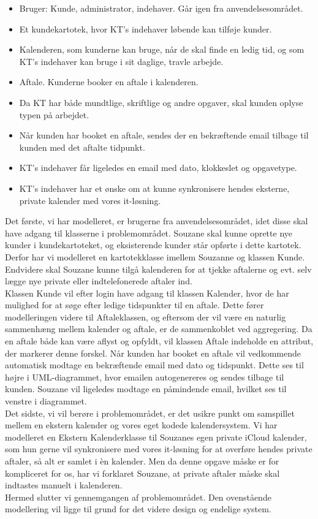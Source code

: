\documentclass[12pt]{article}   %
\begin{document}
\begin{itemize}
\item Bruger: Kunde, administrator, indehaver. Går igen fra
	anvendelsesområdet.
\item Et kundekartotek, hvor KT's indehaver løbende kan tilføje kunder.
\item Kalenderen, som kunderne kan bruge, når de skal finde en ledig tid, og som KT's indehaver kan bruge i sit daglige, travle arbejde.
\item Aftale. Kunderne booker en aftale i kalenderen.
\item Da KT har både mundtlige, skriftlige og andre opgaver, skal kunden	oplyse typen på arbejdet.
\item Når kunden har booket en aftale, sendes der en bekræftende email tilbage til kunden med det aftalte tidpunkt.
\item KT's indehaver får ligeledes en email med dato, klokkeslet og opgavetype.  
\item KT's indehaver har et ønske om at kunne synkronisere hendes eksterne, private kalender med vores it-løsning.
\end{itemize}

Det første, vi har modelleret, er brugerne fra anvendelsesområdet, idet disse skal have adgang til klasserne i problemområdet. Souzane skal kunne oprette nye kunder i kundekartoteket, og eksisterende kunder står opførte i dette kartotek. Derfor har vi modelleret en kartotekklasse imellem Souzanne og klassen Kunde. Endvidere skal Souzane kunne tilgå kalenderen for at tjekke aftalerne og evt. selv lægge nye private eller indtelefonerede aftaler ind. \\
Klassen Kunde vil efter login have adgang til klassen Kalender, hvor de har mulighed for at søge efter ledige tidspunkter til en aftale. Dette fører modelleringen videre til Aftaleklassen, og eftersom der vil være en naturlig sammenhæng mellem kalender og aftale, er de sammenkoblet ved aggregering. Da en aftale både kan være aflyst og opfyldt, vil klassen Aftale indeholde en attribut, der markerer denne forskel. Når kunden har booket en aftale vil vedkommende automatisk modtage en bekræftende email med dato og tidspunkt. Dette ses til højre i UML-diagrammet, hvor emailen autogenereres og sendes tilbage til kunden. Souzane vil ligeledes modtage en påmindende email, hvilket ses til venstre i diagrammet. \\
Det sidste, vi vil berøre i problemområdet, er det usikre punkt om samspillet mellem en ekstern kalender og vores eget kodede kalendersystem. Vi har modelleret en Ekstern Kalenderklasse til Souzanes egen private iCloud kalender, som hun gerne vil synkronisere med vores it-løsning for at overføre hendes private aftaler, så alt er samlet i èn
kalender. Men da denne opgave måske er for kompliceret for os, har vi forklaret Souzane, at private aftaler måske skal indtastes manuelt i kalenderen. \\
Hermed slutter vi gennemgangen af problemområdet. Den ovenstående modellering vil ligge til grund for det videre design og endelige system. 
\end{document}
